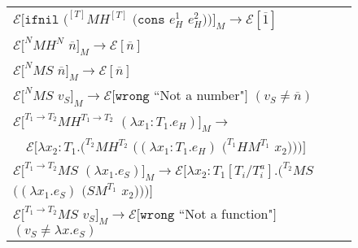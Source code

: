 \begin{figure}[ph!]
\centering
\begin{tabular}{l}

\vspace{5pt}

$\mathscr{E}[\mathtt{ifnil}$ $(^{[T]}MH^{[T]}$ $(\mathtt{cons}$ $e_{H}^{1}$ $e_{H}^{2}))]_{M}\rightarrow\mathscr{E}[\overline{1}]$ \\

\vspace{5pt}

$\mathscr{E}[^{N}MH^{N}$ $\overline{n}]_{M}\rightarrow\mathscr{E}[\overline{n}]$ \\

\vspace{5pt}

$\mathscr{E}[^{N}MS$ $\overline{n}]_{M}\rightarrow\mathscr{E}[\overline{n}]$ \\

\vspace{5pt}

$\mathscr{E}[^{N}MS$ $v_{S}]_{M}\rightarrow\mathscr{E}[\mathtt{wrong}$ ``Not a number"$]$ $(v_{S}\neq\overline{n})$ \\

\vspace{5pt}

$\mathscr{E}[^{T_{1}\rightarrow T_{2}}MH^{T_{1}\rightarrow T_{2}}$ $(\lambda x_{1}:T_{1}.e_{H})]_{M}\rightarrow$ \\

\vspace{5pt}

$\quad\mathscr{E}[\lambda x_{2}:T_{1}.(^{T_{2}}MH^{T_{2}}$ $((\lambda x_{1}:T_{1}.e_{H})$ $(^{T_{1}}HM^{T_{1}}$ $x_{2})))]$ \\

\vspace{5pt}

$\mathscr{E}[^{T_{1}\rightarrow T_{2}}MS$ $(\lambda x_{1}.e_{S})]_{M}\rightarrow\mathscr{E}[\lambda x_{2}:T_{1}[T_{i}/T^{a}_{i}].(^{T_{2}}MS$ $((\lambda x_{1}.e_{S})$ $(SM^{T_{1}}$ $x_{2})))]$ \\

\vspace{5pt}

$\mathscr{E}[^{T_{1}\rightarrow T_{2}}MS$ $v_{S}]_{M}\rightarrow\mathscr{E}[\mathtt{wrong}$ ``Not a function"$]$ $(v_{S}\neq\lambda x.e_{S})$ \\


\end{tabular}
\end{figure}
